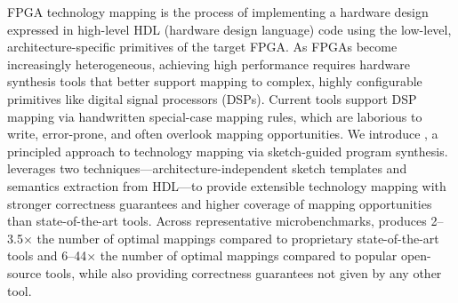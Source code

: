 

FPGA technology mapping is the process of
  implementing a hardware design expressed in 
  high-level HDL (hardware design language) code
  using the low-level, architecture-specific primitives of 
  the target FPGA.
As FPGAs become increasingly heterogeneous, 
  achieving high performance
  requires hardware synthesis tools 
  that better support mapping to complex, 
  highly configurable primitives 
  like digital signal processors (DSPs).
Current tools
  support DSP mapping via handwritten special-case mapping rules,
  which are laborious to write, error-prone, and often overlook mapping opportunities.
We introduce \lr,
  a principled approach to technology mapping via
  sketch-guided program synthesis.
\lr leverages two techniques---architecture-independent 
  sketch templates and semantics extraction from HDL---to
  provide extensible technology mapping 
  with stronger correctness guarantees
  and higher coverage of 
  mapping opportunities
  than state-of-the-art tools.
Across representative microbenchmarks,
  \lr produces
  2--3.5$\times$ the number of optimal mappings
  compared to proprietary state-of-the-art tools
  and
  6--44$\times$ the number of optimal mappings
  compared to popular open-source tools,
  while also providing correctness guarantees
  not given by any other tool.
